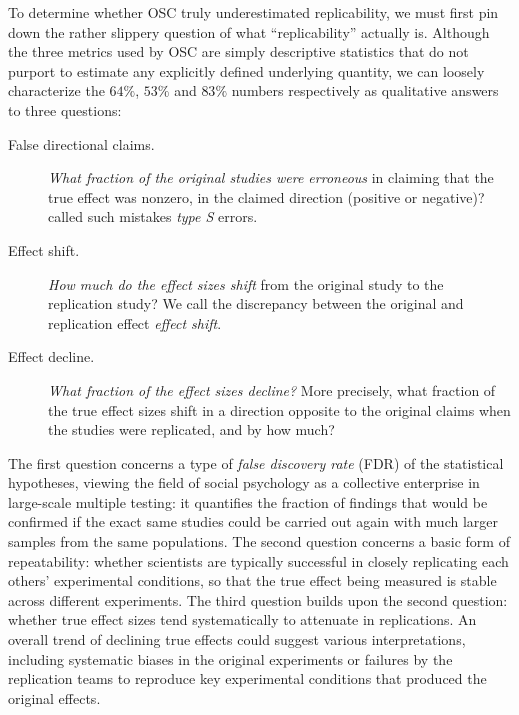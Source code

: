 \documentclass[11pt]{article}
\theoremstyle{definition}
\theoremstyle{custom}
\begin{document}
  To determine whether OSC truly underestimated replicability, we must first pin down the rather slippery question of what ``replicability'' actually is. Although the three metrics used by OSC are simply descriptive statistics that do not purport to estimate any explicitly defined underlying quantity, we can loosely characterize the $64\%$, $53\%$ and $83\%$ numbers respectively as qualitative answers to three questions:
  \begin{description}
    \item[False directional claims.] {\em What fraction of the original studies were erroneous} in claiming that the true effect was nonzero, in the claimed direction (positive or negative)? \citet{Gelman:2000tg} called such mistakes {\em type S} errors.
    \item[Effect shift.] {\em How much do the effect sizes shift} from the original study to the replication study? We call the discrepancy between the original and replication effect {\em effect shift}.
    \item[Effect decline.] {\em What fraction of the effect sizes decline?} More precisely, what fraction of the true effect sizes shift in a direction opposite to the original claims when the studies were replicated, and by how much?
  \end{description}
  The first question concerns a type of {\em false discovery rate} (FDR) of the statistical hypotheses, viewing the field of social psychology as a collective enterprise in large-scale multiple testing: it quantifies the fraction of findings that would be confirmed if the exact same studies could be carried out again with much larger samples from the same populations. The second question concerns a basic form of repeatability: whether scientists are typically successful in closely replicating each others' experimental conditions, so that the true effect being measured is stable across different experiments. The third question builds upon the second question: whether true effect sizes tend systematically to attenuate in replications. An overall trend of declining true effects could suggest various interpretations, including systematic biases in the original experiments or failures by the replication teams to reproduce key experimental conditions that produced the original effects.
\end{document}
